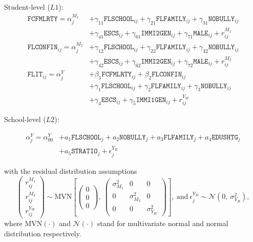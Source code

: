 \noindent Student-level ($L1$):
\begin{equation}
    \begin{aligned}
        \texttt{FCFMLRTY} = \alpha^{M_1}_{j} &+ \gamma_{11}\texttt{FLSCHOOL}_{ij} + \gamma_{21}\texttt{FLFAMILY}_{ij} + \gamma_{31}\texttt{NOBULLY}_{ij}\\
        &+ \gamma_{41}\texttt{ESCS}_{ij} + \gamma_{61}\texttt{IMMI2GEN}_{ij} + \gamma_{71}\texttt{MALE}_{ij} + r^{M_1}_{ij}\\
        \texttt{FLCONFIN}_{ij} = \alpha^{M_2}_{j} &+ \gamma_{12}\texttt{FLSCHOOL}_{ij} + \gamma_{22}\texttt{FLFAMILY}_{ij} + \gamma_{32}\texttt{NOBULLY}_{ij}\\
        &+ \gamma_{42}\texttt{ESCS}_{ij} + \gamma_{62}\texttt{IMMI2GEN}_{ij} + \gamma_{72}\texttt{MALE}_{ij} + r^{M_2}_{ij}\\
        \texttt{FLIT}_{ij} = \alpha^{Y}_{j} &+ \beta_1\texttt{FCFMLRTY}_{ij} + \beta_2\texttt{FLCONFIN}_{ij}\\
        &+ \gamma_1\texttt{FLSCHOOL}_{ij} + \gamma_2\texttt{FLFAMILY}_{ij}+ \gamma_3\texttt{NOBULLY}_{ij} \\
        &+ \gamma_4\texttt{ESCS}_{ij} + \gamma_5\texttt{IMMI1GEN}_{ij} + r^{Y_W}_{ij}
    \end{aligned}
\end{equation}

\noindent School-level ($L2$):

\begin{equation}
    \begin{aligned}
        \alpha^{Y}_{j} = \alpha^Y_{00} &+ a_1\texttt{FLSCHOOL}_j + a_2\texttt{NOBULLY}_j + a_3\texttt{FLFAMILY}_j + a_4\texttt{EDUSHTG}_j\\
        &+ a_5\texttt{STRATIO}_j + \epsilon^{Y_B}_j
    \end{aligned}
\end{equation}

\noindent with the residual distribution assumptions
\begin{equation}
    \begin{pmatrix}
        r^{M_1}_{ij}\\
        r^{M_2}_{ij}\\
        r^{Y_W}_{ij}
    \end{pmatrix}
    \sim \text{MVN}
    \left[
        \begin{pmatrix}
            0\\
            0\\
            0
        \end{pmatrix},\ %
        \begin{pmatrix}
            \sigma^2_{M_1} & 0 & 0\\
            0 & \sigma^2_{M_2} & 0\\
            0 & 0 & \sigma^2_{Y_W}
        \end{pmatrix}
    \right],\ %
        \text{and}\ %
        \epsilon^{Y_B}_j \sim \mathcal{N} \left( 0,\ \sigma^2_{Y_B} \right),
\end{equation}
\noindent where $\text{MVN}(\cdot)$ and $\mathcal{N}(\cdot)$ stand for multivariate normal and normal distribution respectively.

